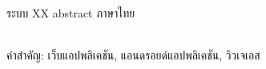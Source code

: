 \begin{thaiabstract}
ระบบ XX abstract ภาษาไทย

\noindent
\\คำสำคัญ: เว็บแอปพลิเคชัน, แอนดรอยด์แอปพลิเคชัน, วิวเจเอส
\end{thaiabstract}
